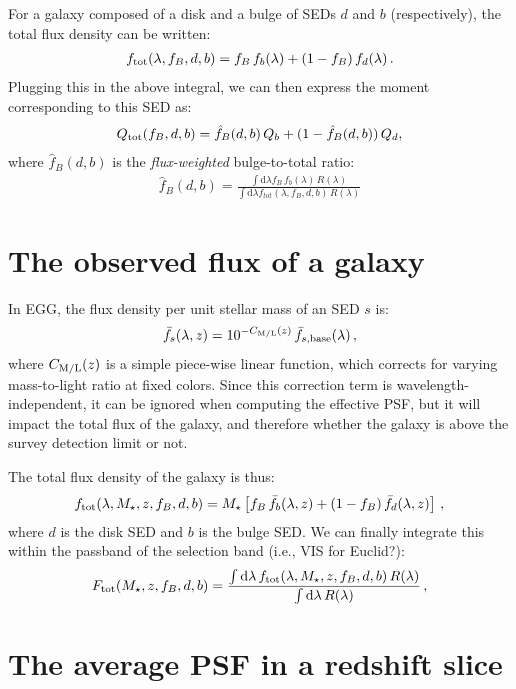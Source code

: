 \documentclass[11pt,a4paper]{article}
\newcommand{\mstar}{M_\star}
\newcommand{\uvj}{\text{\it UVJ}\xspace}
\newcommand{\dd}{\mathrm{d}}
\numberwithin{equation}{section}
\begin{document}
For a galaxy composed of a disk and a bulge of SEDs $d$ and $b$ (respectively), the total flux density can be written:
\begin{align}
f_{\rm tot}(\lambda, f_B, d, b) = f_B\,f_b(\lambda) + (1-f_B)\,f_d(\lambda)\,.
\end{align}
Plugging this in the above integral, we can then express the moment corresponding to this SED as:
\begin{align}
Q_{\rm tot}(f_B, d, b) = \hat{f}_B(d,b)\,Q_b + (1 - \hat{f}_B(d,b))\,Q_d,
\end{align}
where $\hat{f}_B(d,b)$ is the \emph{flux-weighted} bulge-to-total ratio:
\begin{align}
\hat{f}_B(d,b) = \frac{\int \dd\lambda f_B\,f_b(\lambda)\,R(\lambda)}{\int \dd\lambda f_{tot}(\lambda, f_B, d, b)\,R(\lambda)}
\end{align}

\section{The observed flux of a galaxy}

In EGG, the flux density per unit stellar mass of an SED $s$ is:
\begin{align}
\bar{f}_s(\lambda, z) = 10^{-C_{\rm M/L}(z)}\,\bar{f}_{s,{\rm base}}(\lambda)\,,
\end{align}
where $C_{\rm M/L}(z)$ is a simple piece-wise linear function, which corrects for varying mass-to-light ratio at fixed \uvj colors. Since this correction term is wavelength-independent, it can be ignored when computing the effective PSF, but it will impact the total flux of the galaxy, and therefore whether the galaxy is above the survey detection limit or not.

The total flux density of the galaxy is thus:
\begin{align}
f_{\rm tot}(\lambda, \mstar, z, f_B, d, b) = \mstar\left[f_B\,\bar{f}_b(\lambda, z) + (1-f_B)\,\bar{f}_d(\lambda, z)\right]\,,
\end{align}
where $d$ is the disk SED and $b$ is the bulge SED. We can finally integrate this within the passband of the selection band (i.e., VIS for Euclid?):
\begin{align}
F_{\rm tot}(\mstar, z, f_B, d, b) = \frac{\int \dd\lambda\,f_{\rm tot}(\lambda, \mstar, z, f_B, d, b)\,R(\lambda)}{\int \dd\lambda\,R(\lambda)}\,,
\end{align}

\section{The average PSF in a redshift slice}
\end{document}

